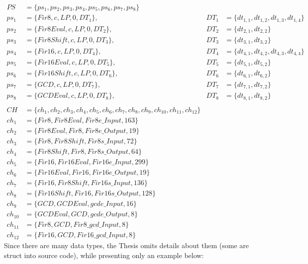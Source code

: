 \begin{align*}
    PS &= \{ ps_1, ps_2, ps_3, ps_4, ps_5, ps_6, ps_7, ps_8 \} & & \\
    ps_1 &= \{ Fir8, c, LP, 0, DT_1 \}, & DT_1 &= \{ dt_{1,1}, dt_{1,2}, dt_{1,3}, dt_{1,4} \} \\
    ps_2 &= \{ Fir8 Eval, c, LP, 0, DT_2 \}, & DT_2 &= \{ dt_{2,1}, dt_{2,2} \} \\
    ps_3 &= \{ Fir8 Shift, c, LP, 0, DT_3 \}, & DT_3 &= \{ dt_{3,1}, dt_{3,2} \} \\
    ps_4 &= \{ Fir16, c, LP, 0, DT_4 \}, & DT_4 &= \{ dt_{4,1}, dt_{4,2}, dt_{4,3}, dt_{4,4} \}  \\
    ps_5 &= \{ Fir16 Eval, c, LP, 0, DT_5 \}, & DT_5 &= \{ dt_{5,1}, dt_{5,2} \} \\
    ps_6 &= \{ Fir16 Shift,c, LP, 0, DT_6 \}, & DT_6 &= \{ dt_{6,1}, dt_{6,2} \} \\
    ps_7 &= \{ GCD, c, LP, 0, DT_7 \}, & DT_7 &= \{ dt_{7,1}, dt_{7,2} \} \\
    ps_8 &= \{ GCD Eval, c, LP, 0, DT_8 \}, & DT_8 &= \{ dt_{8,1}, dt_{8,2} \} \\
    \\
    CH &= \{ ch_1, ch_2, ch_3, ch_4, ch_5, ch_6, ch_7, ch_8, ch_9, ch_{10}, ch_{11}, ch_{12}\} \\
    ch_1 &= \{ Fir8, Fir8 Eval, Fir8e\_Input, 163 \} \\
    ch_2 &= \{ Fir8 Eval, Fir8, Fir8e\_Output, 19 \} \\
    ch_3 &= \{ Fir8, Fir8 Shift, Fir8s\_Input, 72 \} \\
    ch_4 &= \{ Fir8 Shift, Fir8, Fir8s\_Output, 64 \} \\
    ch_5 &= \{ Fir16, Fir16 Eval, Fir16e\_Input, 299 \}  \\
    ch_6 &= \{ Fir16 Eval, Fir16, Fir16e\_Output, 19 \} \\
    ch_7 &= \{ Fir16, Fir8 Shift, Fir16s\_Input, 136 \} \\
    ch_8 &= \{ Fir16 Shift, Fir16, Fir16s\_Output, 128 \} \\
    ch_9 &= \{ GCD, GCD Eval, gcde\_Input, 16 \} \\
    ch_{10} &= \{ GCD Eval, GCD, gcde\_Output, 8 \} \\
    ch_{11} &= \{ Fir8, GCD, Fir8\_gcd\_Input, 8 \} \\
    ch_{12} &= \{ Fir16, GCD, Fir16\_gcd\_Input, 8 \} 
\end{align*}
\normalsize
%
Since there are many data types, the Thesis omits details about them (some are struct into source code), while presenting only an example below: 
